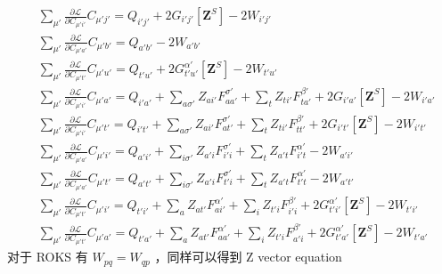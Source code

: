 \documentclass[11pt]{ctexart}
\numberwithin{equation}{section}
\begin{document}
\begin{equation}
    \begin{aligned}
        & \sum_{\mu'}\frac{\partial\mathcal{L}}{\partial C_{\mu' i'}}C_{\mu' j'} 
        = Q_{i'j'} 
        + 2G_{i'j'}[\mathbf{Z}^{S}] 
        - 2W_{i'j'}\\
        & \sum_{\mu'}\frac{\partial\mathcal{L}}{\partial C_{\mu'a'}}C_{\mu'b'} 
        = Q_{a'b'}
        - 2W_{a'b'}\\
        & \sum_{\mu'}\frac{\partial\mathcal{L}}{\partial C_{\mu' t'}}C_{\mu' u'}
        = Q_{t'u'} 
        + 2G_{t'u'}^{\alpha'}[\mathbf{Z}^{S}] 
        - 2W_{t'u'} \\
        & \sum_{\mu'}\frac{\partial\mathcal{L}}{\partial C_{\mu'i'}}C_{\mu' a'}
        = Q_{i'a'} 
        + \sum_{a\sigma'}Z_{ai'}F_{aa'}^{\sigma'} 
        + \sum_{t}Z_{ti'}F_{ta'}^{\beta'}
        + 2G_{i'a'}[\mathbf{Z}^{S}] 
        - 2W_{i'a'}\\
        & \sum_{\mu'}\frac{\partial\mathcal{L}}{\partial C_{\mu' i'}}C_{\mu' t'}
        = Q_{i't'}
        + \sum_{a\sigma'}Z_{ai'}F_{at'}^{\sigma'}
        + \sum_{t}Z_{ti'}F_{tt'}^{\beta'}
        + 2G_{i't'}[\mathbf{Z}^{S}]
        - 2W_{i't'}\\
        & \sum_{\mu'}\frac{\partial\mathcal{L}}{\partial C_{\mu'a'}}C_{\mu' i'}
        = Q_{a'i'}
        + \sum_{i\sigma'}Z_{a'i}F_{i'i}^{\sigma'}
        + \sum_{t}Z_{a't}F_{i't}^{\alpha'}
        - 2W_{a'i'}\\
        & \sum_{\mu'}\frac{\partial\mathcal{L}}{\partial C_{\mu'a'}}C_{\mu' t'}
        = Q_{a't'}
        + \sum_{i\sigma'}Z_{a'i}F_{t'i}^{\sigma'}
        + \sum_{t}Z_{a't}F_{t't}^{\alpha'}
        - 2W_{a't'}\\
        & \sum_{\mu'}\frac{\partial\mathcal{L}}{\partial C_{\mu't'}}C_{\mu'i'}
        = Q_{t'i'}
        + \sum_{a}Z_{at'}F_{ai'}^{\alpha'}
        + \sum_{i}Z_{t' i}F_{i' i}^{\beta'}
        + 2G_{t'i'}^{\alpha'}[\mathbf{Z}^{S}]
        - 2W_{t'i'}\\
        & \sum_{\mu'}\frac{\partial\mathcal{L}}{\partial C_{\mu't'}}C_{\mu'a'}
        = Q_{t'a'}
        + \sum_{a}Z_{at'}F_{aa'}^{\alpha'}
        + \sum_{i}Z_{t' i}F_{a' i}^{\beta'}
        + 2G_{t'a'}^{\alpha'}[\mathbf{Z}^{S}]
        - 2W_{t'a'}
    \end{aligned}
\end{equation}
对于 ROKS 有 $W_{pq}=W_{qp}$ ，同样可以得到 Z vector equation
\end{document}
